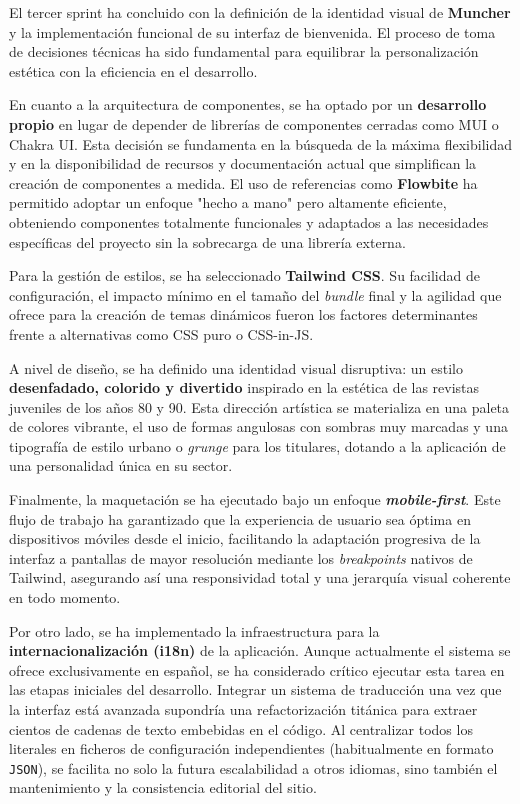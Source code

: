 El tercer sprint ha concluido con la definición de la identidad visual de
\textbf{Muncher} y la implementación funcional de su interfaz de bienvenida. El
proceso de toma de decisiones técnicas ha sido fundamental para equilibrar la
personalización estética con la eficiencia en el desarrollo.

En cuanto a la arquitectura de componentes, se ha optado por un
\textbf{desarrollo propio} en lugar de depender de librerías de componentes
cerradas como MUI o Chakra UI. Esta decisión se fundamenta en la búsqueda de la
máxima flexibilidad y en la disponibilidad de recursos y documentación actual
que simplifican la creación de componentes a medida. El uso de referencias como
\textbf{Flowbite} ha permitido adoptar un enfoque "hecho a mano" pero altamente
eficiente, obteniendo componentes totalmente funcionales y adaptados a las
necesidades específicas del proyecto sin la sobrecarga de una librería externa.

Para la gestión de estilos, se ha seleccionado \textbf{Tailwind CSS}. Su
facilidad de configuración, el impacto mínimo en el tamaño del \textit{bundle}
final y la agilidad que ofrece para la creación de temas dinámicos fueron los
factores determinantes frente a alternativas como CSS puro o CSS-in-JS.

A nivel de diseño, se ha definido una identidad visual disruptiva: un estilo
\textbf{desenfadado, colorido y divertido} inspirado en la estética de las
revistas juveniles de los años 80 y 90. Esta dirección artística se materializa
en una paleta de colores vibrante, el uso de formas angulosas con sombras muy
marcadas y una tipografía de estilo urbano o \textit{grunge} para los
titulares, dotando a la aplicación de una personalidad única en su sector.

Finalmente, la maquetación se ha ejecutado bajo un enfoque
\textbf{\textit{mobile-first}}. Este flujo de trabajo ha garantizado que la
experiencia de usuario sea óptima en dispositivos móviles desde el inicio,
facilitando la adaptación progresiva de la interfaz a pantallas de mayor
resolución mediante los \textit{breakpoints} nativos de Tailwind, asegurando
así una responsividad total y una jerarquía visual coherente en todo momento.

Por otro lado, se ha implementado la infraestructura para la
\textbf{internacionalización (i18n)} de la aplicación. Aunque actualmente el
sistema se ofrece exclusivamente en español, se ha considerado crítico ejecutar
esta tarea en las etapas iniciales del desarrollo. Integrar un sistema de
traducción una vez que la interfaz está avanzada supondría una refactorización
titánica para extraer cientos de cadenas de texto embebidas en el código. Al
centralizar todos los literales en ficheros de configuración independientes
(habitualmente en formato \texttt{JSON}), se facilita no solo la futura
escalabilidad a otros idiomas, sino también el mantenimiento y la consistencia
editorial del sitio.

